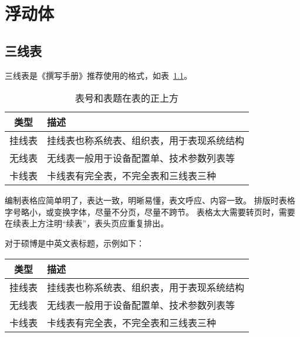 
\chapter{浮动体}

\section{三线表}

三线表是《撰写手册》推荐使用的格式，如表~\ref{tab:exampletable}。
\begin{table}[h]
  \centering
  \caption{表号和表题在表的正上方} %
  \label{tab:exampletable}
  \begin{tabular}{cl}
    \toprule
    类型   & 描述                                       \\
    \midrule
    挂线表 & 挂线表也称系统表、组织表，用于表现系统结构 \\
    无线表 & 无线表一般用于设备配置单、技术参数列表等   \\
    卡线表 & 卡线表有完全表，不完全表和三线表三种       \\
    \bottomrule
  \end{tabular}
\end{table}

编制表格应简单明了，表达一致，明晰易懂，表文呼应、内容一致。
排版时表格字号略小，或变换字体，尽量不分页，尽量不跨节。
表格太大需要转页时，需要在续表上方注明“续表”，表头页应重复排出。\par
对于硕博是中英文表标题，示例如下：
\begin{table}[h]
  \centering
  \label{tab:exampletable-zh-en}
  \begin{tabular}{cl}
    \toprule
    类型   & 描述                                       \\
    \midrule
    挂线表 & 挂线表也称系统表、组织表，用于表现系统结构 \\
    无线表 & 无线表一般用于设备配置单、技术参数列表等   \\
    卡线表 & 卡线表有完全表，不完全表和三线表三种       \\
    \bottomrule
  \end{tabular}
\end{table}


